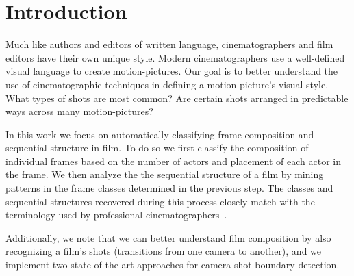 \section*{Introduction}

Much like authors and editors of written language, cinematographers and film editors have their own unique style.
Modern cinematographers use a well-defined visual language to create motion-pictures. Our goal is to better understand the use of cinematographic techniques in defining a motion-picture's visual style. What types of shots are most common? Are certain shots arranged in predictable ways across many motion-pictures?

In this work we focus on automatically classifying frame composition and sequential structure in film.  To do so we first classify the composition of individual frames based on the number of actors and placement of each actor in the frame.  We then analyze the the sequential structure of a film by mining patterns in the frame classes determined in the previous step.  The classes and sequential structures recovered during this process closely match with the terminology used by professional cinematographers~\cite{arijon_grammar_1991}.  

Additionally, we note that we can better understand film composition by also recognizing a film's shots (transitions from one camera to another), and we implement two state-of-the-art approaches for camera shot boundary detection.

